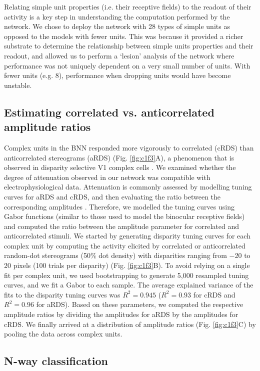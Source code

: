 Relating simple unit properties (i.e. their receptive fields) to the readout of their activity is a key step in understanding the computation performed by the network. We chose to deploy the network with 28 types of simple units as opposed to the models with fewer units. This was because it provided a richer substrate to determine the relationship between simple units properties and their readout, and allowed us to perform a `lesion' analysis of the network where performance was not uniquely dependent on a very small number of units. With fewer units (e.g. 8), performance when dropping units would have become unstable.


\subsection*{Estimating correlated vs. anticorrelated amplitude ratios}

Complex units in the BNN responded more vigorously to correlated (cRDS) than anticorrelated stereograms (aRDS) (Fig. \ref{fig:c1f3}A), a phenomenon that is observed in disparity selective V1 complex cells \cite{Cumming:1997ve,Samonds:2013cs}. We examined whether the degree of attenuation observed in our network was compatible with electrophysiological data. Attenuation is commonly assessed by modelling tuning curves for aRDS and cRDS, and then evaluating the ratio between the corresponding amplitudes \cite{Cumming:1997ve,Tanabe:2004mw,Nieder:2001jl}. Therefore, we modelled the tuning curves using Gabor functions (similar to those used to model the binocular receptive fields) and computed the ratio between the amplitude parameter for correlated and anticorrelated stimuli. We started by generating disparity tuning curves for each complex unit by computing the activity elicited by correlated or anticorrelated random-dot stereograms (50\% dot density) with disparities ranging from $-$20 to 20 pixels (100 trials per disparity) (Fig. \ref{fig:c1f3}B). To avoid relying on a single fit per complex unit, we used bootstrapping to generate 5,000 resampled tuning curves, and we fit a Gabor to each sample. The average explained variance of the fits to the disparity tuning curves was $R^2 = 0.945$ ($R^2=0.93$ for cRDS and $R^2=0.96$ for aRDS). Based on these parameters, we computed the respective amplitude ratios by dividing the amplitudes for aRDS by the amplitudes for cRDS. We finally arrived at a distribution of amplitude ratios (Fig. \ref{fig:c1f3}C) by pooling the data across complex units.

\subsection*{N-way classification}


